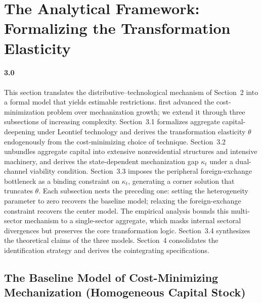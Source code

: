 \section{The Analytical Framework: Formalizing the
	Transformation Elasticity}

\paragraph{3.0}
This section translates the distributive--technological
mechanism of Section~2 into a formal model that yields
estimable restrictions. \citet{CajasGuajirro2024} first
advanced the cost-minimization problem over mechanization
growth; we extend it through three subsections of
increasing complexity. Section~3.1 formalizes aggregate
capital-deepening under Leontief technology and derives
the transformation elasticity $\theta$ endogenously from
the cost-minimizing choice of technique. Section~3.2
unbundles aggregate capital into extensive nonresidential
structures and intensive machinery, and derives the
state-dependent mechanization gap $\kappa_t$ under a
dual-channel viability condition. Section~3.3 imposes the
peripheral foreign-exchange bottleneck as a binding
constraint on $\kappa_t$, generating a corner solution
that truncates $\theta$. Each subsection nests the
preceding one: setting the heterogeneity parameter to
zero recovers the baseline model; relaxing the
foreign-exchange constraint recovers the center model.
The empirical analysis bounds this multi-sector mechanism
to a single-sector aggregate, which masks internal
sectoral divergences but preserves the core transformation
logic. Section~3.4 synthesizes the theoretical claims of
the three models. Section~4 consolidates the
identification strategy and derives the cointegrating
specifications.

\subsection{The Baseline Model of Cost-Minimizing
	Mechanization (Homogeneous Capital Stock)}

